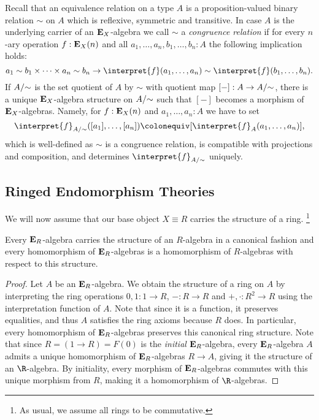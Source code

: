 {Recall that an equivalence relation on a type \(A\) is a proposition-valued binary relation \(\sim\) on \(A\) which is reflexive, symmetric and transitive.
In case \(A\) is the underlying carrier of an \(\mathbf{E}_X\)-algebra we call \(\sim\) a \emph{congruence relation} if for every \(n\)-ary operation \(f:\mathbf{E}_X(n)\) and all \(a_1,\dots,a_n,b_1,\dots,b_n : A\) the following implication holds:
\[
  a_1 \sim b_1 \times \dots\times a_n \sim b_n \to \interpret{f}(a_1,\dots,a_n) \sim \interpret{f}(b_1,\dots,b_n).
\]
If \({A}/{\sim}\) is the set quotient of \(A\) by \(\sim\) with quotient map \([-]:A \to {A}/{\sim}\), there is a unique \(\mathbf{E}_X\)-algebra structure on \({A}/{\sim}\) such that \([-]\) becomes a morphism of \(\mathbf{E}_X\)-algebras.
Namely, for \(f:\mathbf{E}_X(n)\) and \(a_1,\dots,a_n:A\) we have to set
\[
  \interpret{f}_{\quotient{A}{\sim}}([a_1],\dots,[a_n]) \colonequiv [\interpret{f}_A(a_1,\dots,a_n)],
\]
which is well-defined as \(\sim\) is a congruence relation, is compatible with projections and composition, and determines \(\interpret{f}_{\quotient{A}{\sim}}\) uniquely.


\subsection{Ringed Endomorphism Theories}

We will now assume that our base object \(X\equiv R\) carries the structure of a ring.%
\footnote{As usual, we assume all rings to be commutative.}
\begin{lemma}
  Every \(\mathbf{E}_R\)-algebra carries the structure of an \(R\)-algebra in a canonical fashion and every homomorphism of \(\mathbf{E}_R\)-algebras is a homomorphism of \(R\)-algebras with respect to this structure.
\end{lemma}
\begin{proof}
  Let \(A\) be an \(\mathbf{E}_R\)-algebra.
  We obtain the structure of a ring on \(A\) by interpreting the ring operations \(0,1:1\to R\), \(- : R\to R\) and \(+,\cdot : R^2\to R\) using the interpretation function of \(A\).
  Note that since it is a function, it preserves equalities, and thus \(A\) satisfies the ring axioms because \(R\) does.
  In particular, every homomorphism of \(\mathbf{E}_R\)-algebras preserves this canonical ring structure.
  Note that since \(R = (1\to R)= F(0)\) is the \emph{initial} \(\mathbf{E}_R\)-algebra, every \(\mathbf{E}_R\)-algebra \(A\) admits a unique homomorphism of \(\mathbf{E}_R\)-algebras \(R\to A\), giving it the structure of an \(\R\)-algebra.
  By initiality, every morphism of \(\mathbf{E}_R\)-algebras commutes with this unique morphism from \(R\), making it a homomorphism of \(\R\)-algebras.
\end{proof}

}
